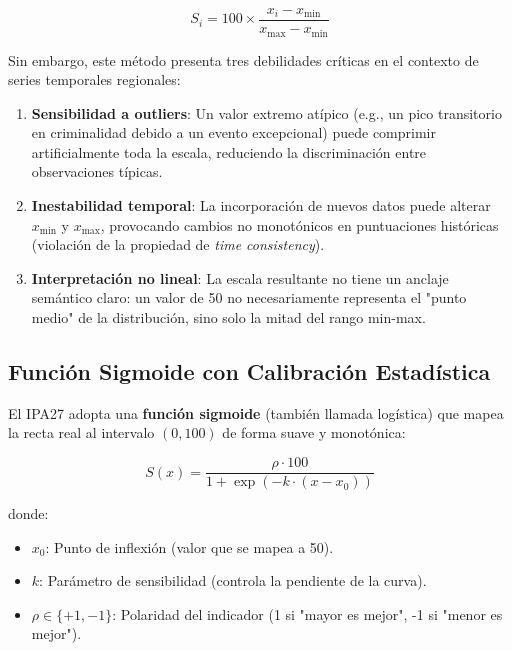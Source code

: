 \documentclass[authoryear,12pt]{elsarticle}
\begin{document}
\begin{equation}
S_i = 100 \times \frac{x_i - x_{\min}}{x_{\max} - x_{\min}}
\end{equation}

Sin embargo, este método presenta tres debilidades críticas en el contexto de series temporales regionales:

\begin{enumerate}
    \item \textbf{Sensibilidad a outliers}: Un valor extremo atípico (e.g., un pico transitorio en criminalidad debido a un evento excepcional) puede comprimir artificialmente toda la escala, reduciendo la discriminación entre observaciones típicas.

    \item \textbf{Inestabilidad temporal}: La incorporación de nuevos datos puede alterar $x_{\min}$ y $x_{\max}$, provocando cambios no monotónicos en puntuaciones históricas (violación de la propiedad de \textit{time consistency}).

    \item \textbf{Interpretación no lineal}: La escala resultante no tiene un anclaje semántico claro: un valor de 50 no necesariamente representa el "punto medio" de la distribución, sino solo la mitad del rango min-max.
\end{enumerate}

\subsection{Función Sigmoide con Calibración Estadística}

El IPA27 adopta una \textbf{función sigmoide} (también llamada logística) que mapea la recta real al intervalo $(0, 100)$ de forma suave y monotónica:

\begin{equation}
S(x) = \frac{\rho \cdot 100}{1 + \exp(-k \cdot (x - x_0))}
\end{equation}

donde:
\begin{itemize}
    \item $x_0$: Punto de inflexión (valor que se mapea a 50).
    \item $k$: Parámetro de sensibilidad (controla la pendiente de la curva).
    \item $\rho \in \{+1, -1\}$: Polaridad del indicador (1 si "mayor es mejor", -1 si "menor es mejor").
\end{itemize}
\end{document}
